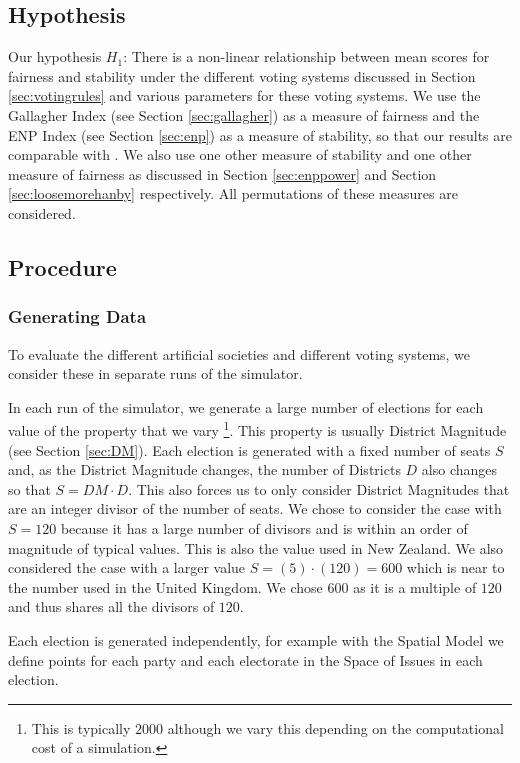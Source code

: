\documentclass{article}
\begin{document}
\subsection{Hypothesis}
Our hypothesis $H_1$: There is a non-linear relationship between mean scores for fairness and stability under the different voting systems discussed in Section \ref{sec:votingrules} and various parameters for these voting systems. We use the Gallagher Index (see Section \ref{sec:gallagher}) as a measure of fairness and the ENP Index (see Section \ref{sec:enp}) as a measure of stability, so that our results are comparable with \cite{sweetspot}. We also use one other measure of stability and one other measure of fairness as discussed in Section \ref{sec:enppower} and Section \ref{sec:loosemorehanby} respectively. All permutations of these measures are considered.

\subsection{Procedure}
\subsubsection{Generating Data}
To evaluate the different artificial societies and different voting systems, we consider these in separate runs of the simulator.

In each run of the simulator, we generate a large number of elections for each value of the property that we vary \footnote{This is typically $2000$ although we vary this depending on the computational cost of a simulation.}. This property is usually District Magnitude (see Section \ref{sec:DM}). Each election is generated with a fixed number of seats $S$ and, as the District Magnitude changes, the number of Districts $D$ also changes so that $S=DM \cdot D$. This also forces us to only consider District Magnitudes that are an integer divisor of the number of seats. We chose to consider the case with $S=120$ because it has a large number of divisors and is within an order of magnitude of typical values. This is also the value used in New Zealand. We also considered the case with a larger value $S=(5) \cdot (120)=600$ which is near to the number used in the United Kingdom. We chose $600$ as it is a multiple of $120$ and thus shares all the divisors of $120$.

Each election is generated independently, for example with the Spatial Model we define points for each party and each electorate in the Space of Issues in each election.
\end{document}
